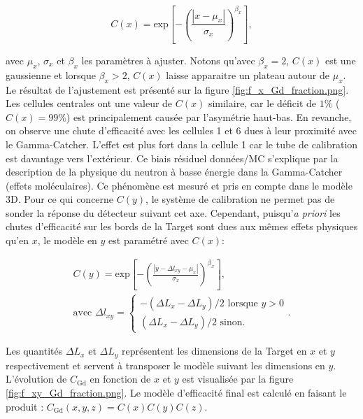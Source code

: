 \begin{equation}
    C(x) = \textrm{exp}\left[-\left( \frac{|x - \mu_x|}{\sigma_x} \right)^{\beta_x}\right],
\end{equation}

\bigbreak

avec $\mu_x$, $\sigma_x$ et $\beta_x$ les paramètres à ajuster. Notons qu'avec $\beta_x = 2$, $C(x)$ est une gaussienne et lorsque $\beta_x > 2$, $C(x)$ laisse apparaitre un plateau autour de $\mu_x$. Le résultat de l'ajustement est présenté sur la figure \ref{fig:f_x_Gd_fraction.png}. Les cellules centrales ont une valeur de $C(x)$ similaire, car le déficit de $1\%$ ($C(x) = 99\%$) est principalement causée par l'asymétrie haut-bas. En revanche, on observe une chute d'efficacité avec les cellules 1 et 6 dues à leur proximité avec le Gamma-Catcher. L'effet est plus fort dans la cellule 1 car le tube de calibration est davantage vers l'extérieur. Ce biais résiduel données/MC s'explique par la description de la physique du neutron à basse énergie dans la Gamma-Catcher (effets moléculaires). Ce phénomène est mesuré et pris en compte dans le modèle 3D. Pour ce qui concerne $C(y)$, le système de calibration ne permet pas de sonder la réponse du détecteur suivant cet axe. Cependant, puisqu'\textit{a priori} les chutes d'efficacité sur les bords de la Target sont dues aux mêmes effets physiques qu'en $x$, le modèle en $y$ est paramétré avec $C(x)$:

\begin{equation}
\begin{gathered}
    C(y) = \textrm{exp}\left[-\left( \frac{|y - \Delta l_{xy} - \mu_x|}{\sigma_x} \right)^{\beta_x}\right],\\
    \textrm{avec } \Delta l_{xy} = \left\{
    \begin{array}{l}
        - (\Delta L_x - \Delta L_y)/2 \textrm{ lorsque } y > 0\\
        (\Delta L_x - \Delta L_y)/2 \textrm{ sinon.}
    \end{array}
    \right. .
\end{gathered}
\end{equation}

\bigbreak

Les quantités $\Delta L_x$ et $\Delta L_y$ représentent les dimensions de la Target en $x$ et $y$ respectivement et servent à transposer le modèle suivant les dimensions en $y$. L'évolution de $C_\textrm{Gd}$ en fonction de $x$ et $y$ est visualisée par la figure \ref{fig:f_xy_Gd_fraction.png}. Le modèle d'efficacité final est calculé en faisant le produit : $C_\textrm{Gd}(x,y,z) = C(x)C(y)C(z)$.\\

